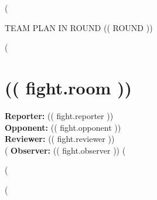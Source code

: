 (%

	\begin{center}
	\LARGE \uppercase{Team Plan  in Round (( round ))}
	\bigskip
	\end{center}
    \begin{multicols}{2}
    (%
        \section*{(( fight.room ))}
            \textbf{Reporter:} (( fight.reporter ))\\
            \textbf{Opponent:} (( fight.opponent ))\\
            \textbf{Reviewer:} (( fight.reviewer ))\\
        (%
            \textbf{Observer:} (( fight.observer ))
        (%

	(%
    \end{multicols}
(%